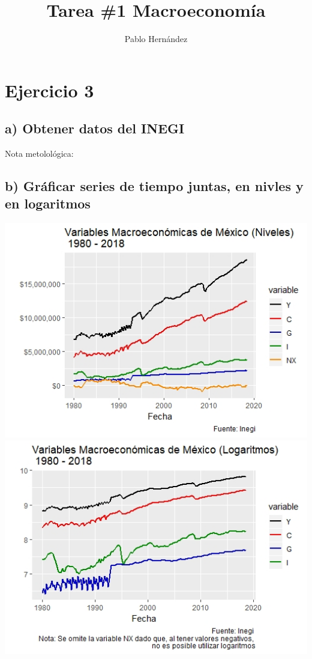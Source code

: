 \documentclass[11pt,a4paper]{article}
\author{Pablo Hernández}
\title{Tarea \#1 Macroeconomía}
\begin{document}
\maketitle

\section*{Ejercicio 3}


\subsection*{a) Obtener datos del INEGI}
Nota metolológica: 

\subsection*{b) Gráficar series de tiempo juntas, en nivles y en logaritmos}


\includegraphics{plotNiveles}
\includegraphics{plotLogs}
\end{document}
